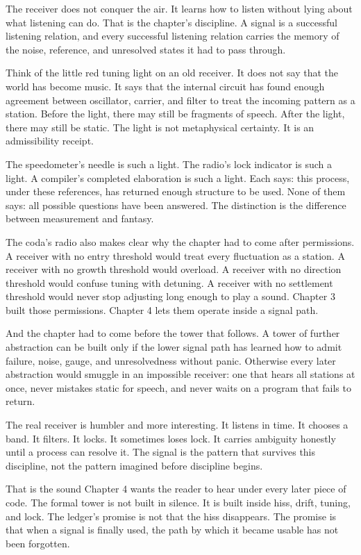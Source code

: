The receiver does not conquer the air. It learns how to listen without lying
about what listening can do. That is the chapter's discipline. A signal is a
successful listening relation, and every successful listening relation carries
the memory of the noise, reference, and unresolved states it had to pass
through.

Think of the little red tuning light on an old receiver. It does not say that
the world has become music. It says that the internal circuit has found enough
agreement between oscillator, carrier, and filter to treat the incoming pattern
as a station. Before the light, there may still be fragments of speech. After
the light, there may still be static. The light is not metaphysical certainty.
It is an admissibility receipt.

The speedometer's needle is such a light. The radio's lock indicator is such a
light. A compiler's completed elaboration is such a light. Each says: this
process, under these references, has returned enough structure to be used. None
of them says: all possible questions have been answered. The distinction is
the difference between measurement and fantasy.

The coda's radio also makes clear why the chapter had to come after
permissions. A receiver with no entry threshold would treat every fluctuation
as a station. A receiver with no growth threshold would overload. A receiver
with no direction threshold would confuse tuning with detuning. A receiver
with no settlement threshold would never stop adjusting long enough to play a
sound. Chapter 3 built those permissions. Chapter 4 lets them operate inside a
signal path.

And the chapter had to come before the tower that follows. A tower of further
abstraction can be built only if the lower signal path has learned how to admit
failure, noise, gauge, and unresolvedness without panic. Otherwise every later
abstraction would smuggle in an impossible receiver: one that hears all
stations at once, never mistakes static for speech, and never waits on a
program that fails to return.

The real receiver is humbler and more interesting. It listens in time. It
chooses a band. It filters. It locks. It sometimes loses lock. It carries
ambiguity honestly until a process can resolve it. The signal is the pattern
that survives this discipline, not the pattern imagined before discipline
begins.

That is the sound Chapter 4 wants the reader to hear under every later piece
of code. The formal tower is not built in silence. It is built inside hiss,
drift, tuning, and lock. The ledger's promise is not that the hiss disappears.
The promise is that when a signal is finally used, the path by which it became
usable has not been forgotten.

